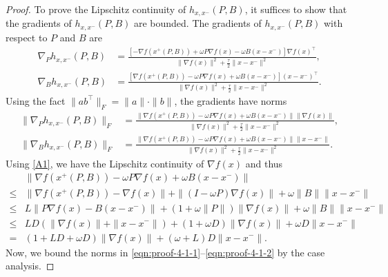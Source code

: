 \begin{proof}
To prove the Lipschitz continuity of $h_{x, x^{-}}(P, B)$, it suffices to show that the gradients of $h_{x, x^{-}}(P, B)$ are bounded. 
The gradients of $h_{x, x^{-}}(P, B)$ with respect to $P$ and $B$ are
\begin{align*}
\nabla_P h_{x, x^{-}}(P, B) & = \tfrac{[- \nabla f(x^{+}(P, B)) + \omega P \nabla f(x) - \omega B (x - x^{-})] \nabla f(x)^{\top}}{\| \nabla f (x) \|^2 + \frac{\tau}{2} \| x - x^- \|^2} , \\
\nabla_B h_{x, x^{-}}(P, B) & = \tfrac{[\nabla f(x^{+}(P, B)) - \omega P \nabla f(x) + \omega B (x - x^{-})](x - x^{-})^{\top}}{\| \nabla f (x) \|^2 + \frac{\tau}{2} \| x - x^- \|^2}.
\end{align*}
Using the fact $\|a b^{\top}\|_F = \|a\| \cdot \|b\|$, the gradients have norms
\begin{align}
\|\nabla_P h_{x, x^{-}}(P, B)\|_F & = \tfrac{\| \nabla f(x^{+}(P, B)) - \omega P \nabla f(x) + \omega B (x - x^{-})\| \|\nabla f(x)\|}{\| \nabla f (x) \|^2 + \frac{\tau}{2} \| x - x^- \|^2}, \label{eqn:proof-4-1-1} \\
\|\nabla_B h_{x, x^{-}}(P, B)\|_F & = \tfrac{\| \nabla f(x^{+}(P, B)) - \omega P \nabla f(x) + \omega B (x - x^{-})\|\|x - x^{-}\|}{\| \nabla f (x) \|^2 + \frac{\tau}{2} \| x - x^- \|^2}. \label{eqn:proof-4-1-2}
\end{align}
Using \ref{A1}, we have the Lipschitz continuity of $\nabla f(x)$ and thus
\begin{align}
&\| \nabla f(x^{+}(P, B)) - \omega P \nabla f(x) + \omega B (x - x^{-})\| \nonumber \\
\leq{} & \|\nabla f(x^{+}(P, B)) - \nabla f(x)\| + \| (I - \omega P) \nabla f(x)\| + \omega \|B\| \|x - x^{-}\| \nonumber \\
\leq{} & L \| P \nabla f(x) - B (x - x^{-}) \| + (1 + \omega \|P\| ) \|\nabla f(x)\| + \omega \|B\| \|x - x^{-}\| \nonumber\\
\leq{} & L D (\| \nabla f(x) \| + \| x - x^{-} \|) + (1 + \omega D ) \|\nabla f(x)\| + \omega D \|x - x^{-}\| \nonumber \\
={} &(1 + LD + \omega D ) \|\nabla f(x)\| + (\omega + L) D \|x - x^{-}\|. \label{eqn:proof-4-1-3}
\end{align}
Now, we bound the norms in \eqref{eqn:proof-4-1-1}--\eqref{eqn:proof-4-1-2} by the case analysis.


\end{proof}
